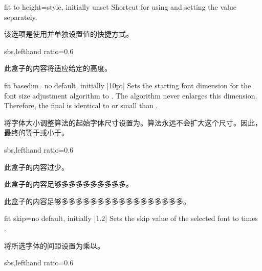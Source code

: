\begin{docTcbKey}{fit to height}{=}{style, initially unset}
Shortcut for using  and setting the  value separately.

该选项是使用并单独设置值的快捷方式。
\begin{dispExample*}{sbs,lefthand ratio=0.6}

\begin{tcolorbox}[fit to height=2cm]
此盒子的内容将适应给定的高度。
\end{tcolorbox}
\end{dispExample*}
\end{docTcbKey}

\begin{docTcbKey}{fit basedim}{=}{no default, initially |10pt|}
Sets the starting font dimension for the font size adjustment algorithm
to . The algorithm never enlarges this dimension.
Therefore, the final  is identical to or small than
.

将字体大小调整算法的起始字体尺寸设置为。算法永远不会扩大这个尺寸。因此，最终的等于或小于。
\begin{dispExample*}{sbs,lefthand ratio=0.6}

\begin{tcolorbox}[fit to=4cm and 2cm]
此盒子的内容过少。
\end{tcolorbox}

\begin{tcolorbox}[fit to=4cm and 2cm,
  fit basedim=50pt]
此盒子的内容足够多多多多多多多多多。
\end{tcolorbox}

\begin{tcolorbox}[fit to=4cm and 2cm,
fit basedim=50pt]
此盒子的内容足够多多多多多多多多多多多多多多多多多。
\end{tcolorbox}
\end{dispExample*}
\end{docTcbKey}


\begin{docTcbKey}{fit skip}{=}{no default, initially |1.2|}
Sets the skip value of the selected font to  times .

将所选字体的间距设置为乘以。
\begin{dispExample*}{sbs,lefthand ratio=0.6}

\begin{tcolorbox}[fit to=5cm and 4cm,
  fit skip=1.0  ]
  \lipsum[1]
\end{tcolorbox}
\end{dispExample*}
\end{docTcbKey}

